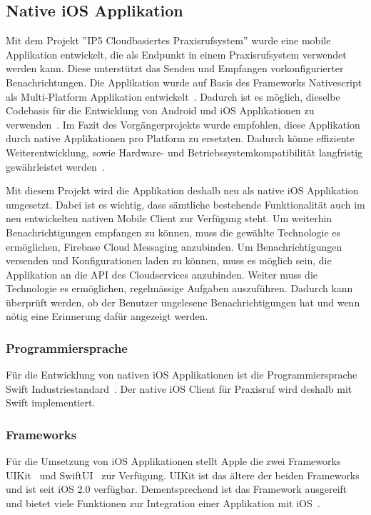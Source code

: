 
\subsection{Native iOS Applikation}

Mit dem Projekt ''IP5 Cloudbasiertes Praxisrufsystem'' wurde eine mobile Applikation entwickelt, die als Endpunkt in einem Praxisrufsystem verwendet werden kann.
Diese unterstützt das Senden und Empfangen vorkonfigurierter Benachrichtungen.
Die Applikation wurde auf Basis des Frameworks Nativescript als Multi-Platform Applikation entwickelt~\cite{ip5}.
Dadurch ist es möglich, dieselbe Codebasis für die Entwicklung von Android und iOS Applikationen zu verwenden~\cite{nativescript}.
Im Fazit des Vorgängerprojekts wurde empfohlen, diese Applikation durch native Applikationen pro Platform zu ersetzten.
Dadurch könne effiziente Weiterentwicklung, sowie Hardware- und Betriebssystemkompatibilität langfristig gewährleistet werden~\cite{ip5}.

Mit diesem Projekt wird die Applikation deshalb neu als native iOS Applikation umgesetzt.
Dabei ist es wichtig, dass sämtliche bestehende Funktionalität auch im neu entwickelten nativen Mobile Client zur Verfügung steht.
Um weiterhin Benachrichtigungen empfangen zu können, muss die gewählte Technologie es ermöglichen, Firebase Cloud Messaging anzubinden.
Um Benachrichtigungen versenden und Konfigurationen laden zu können, muss es möglich sein, die Applikation an die API des Cloudservices anzubinden.
Weiter muss die Technologie es ermöglichen, regelmässige Aufgaben auszuführen.
Dadurch kann überprüft werden, ob der Benutzer ungelesene Benachrichtigungen hat und wenn nötig eine Erinnerung dafür angezeigt werden.

\subsubsection{Programmiersprache}

Für die Entwicklung von nativen iOS Applikationen ist die Programmiersprache Swift Industriestandard~\cite{ios_swift}.
Der native iOS Client für Praxisruf wird deshalb mit Swift implementiert.

\subsubsection{Frameworks}

Für die Umsetzung von iOS Applikationen stellt Apple die zwei Frameworks UIKit~\cite{ios_uikit} und SwiftUI~\cite{ios_swift_ui} zur Verfügung.
UIKit ist das ältere der beiden Frameworks und ist seit iOS 2.0 verfügbar.
Dementsprechend ist das Framework ausgereift und bietet viele Funktionen zur Integration einer Applikation mit iOS~\cite{ios_uikit}.

